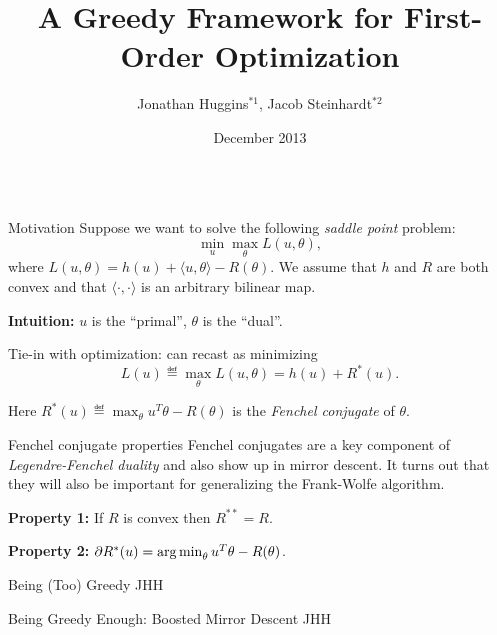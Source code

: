 \documentclass[final]{beamer}
\title%
{A Greedy Framework for First-Order Optimization}
\author%
{Jonathan Huggins$^{*1}$, Jacob Steinhardt$^{*2}$}
\institute[] %
{$^{*}$Both authors contributed equally to this work. $^1$Massachusetts Institute of Technology. $^{2}$Stanford University.}
\date{December 2013}
\begin{document}
\begin{frame}{} 
\begin{columns}
\begin{column}{0.48\linewidth}


\begin{block}{\large Motivation}
Suppose we want to solve the following \emph{saddle point} problem:
\[ \min_u \max_{\theta} L(u, \theta), \]
where $L(u,\theta) = h(u) + \langle u, \theta \rangle - R(\theta)$. 
We assume that $h$ and $R$ are both convex and that $\langle \cdot, \cdot \rangle$ 
is an arbitrary bilinear map.

\textbf{Intuition:} $u$ is the ``primal'', $\theta$ is the ``dual''.

Tie-in with optimization: can recast as minimizing
\[ L(u) \eqdef \max_{\theta} L(u, \theta) = h(u) + R^*(u). \]

Here $R^*(u) \eqdef \max_{\theta} u^T\theta - R(\theta)$ is the 
\emph{Fenchel conjugate} of $\theta$.
\end{block}

\begin{block}{\large Fenchel conjugate properties}
Fenchel conjugates are a key component of \emph{Legendre-Fenchel duality} 
and also show up in mirror descent. It turns out that they will also be 
important for generalizing the Frank-Wolfe algorithm.

\textbf{Property 1:} If $R$ is convex then $R^{**} = R$.

\textbf{Property 2:} $\partial R^*(u) = \argmin_{\theta} u^T\theta - R(\theta)$.
\end{block}

\begin{block}{\large Being (Too) Greedy}
JHH
\end{block}

\begin{block}{\large Being Greedy Enough: Boosted Mirror Descent}
JHH


\end{block}
\end{column}
\end{columns}
\end{frame}
\end{document}
